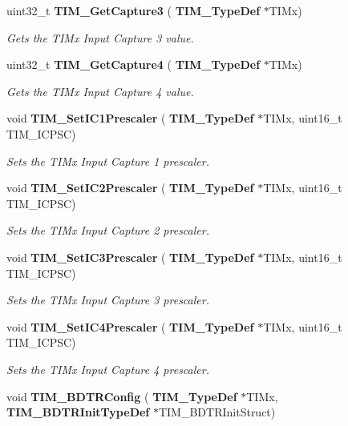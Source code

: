\begin{DoxyCompactItemize}
uint32\+\_\+t \textbf{ T\+I\+M\+\_\+\+Get\+Capture3} (\textbf{ T\+I\+M\+\_\+\+Type\+Def} $\ast$T\+I\+Mx)
\begin{DoxyCompactList}\small\item\em Gets the T\+I\+Mx Input Capture 3 value. \end{DoxyCompactList}\item 
uint32\+\_\+t \textbf{ T\+I\+M\+\_\+\+Get\+Capture4} (\textbf{ T\+I\+M\+\_\+\+Type\+Def} $\ast$T\+I\+Mx)
\begin{DoxyCompactList}\small\item\em Gets the T\+I\+Mx Input Capture 4 value. \end{DoxyCompactList}\item 
void \textbf{ T\+I\+M\+\_\+\+Set\+I\+C1\+Prescaler} (\textbf{ T\+I\+M\+\_\+\+Type\+Def} $\ast$T\+I\+Mx, uint16\+\_\+t T\+I\+M\+\_\+\+I\+C\+P\+SC)
\begin{DoxyCompactList}\small\item\em Sets the T\+I\+Mx Input Capture 1 prescaler. \end{DoxyCompactList}\item 
void \textbf{ T\+I\+M\+\_\+\+Set\+I\+C2\+Prescaler} (\textbf{ T\+I\+M\+\_\+\+Type\+Def} $\ast$T\+I\+Mx, uint16\+\_\+t T\+I\+M\+\_\+\+I\+C\+P\+SC)
\begin{DoxyCompactList}\small\item\em Sets the T\+I\+Mx Input Capture 2 prescaler. \end{DoxyCompactList}\item 
void \textbf{ T\+I\+M\+\_\+\+Set\+I\+C3\+Prescaler} (\textbf{ T\+I\+M\+\_\+\+Type\+Def} $\ast$T\+I\+Mx, uint16\+\_\+t T\+I\+M\+\_\+\+I\+C\+P\+SC)
\begin{DoxyCompactList}\small\item\em Sets the T\+I\+Mx Input Capture 3 prescaler. \end{DoxyCompactList}\item 
void \textbf{ T\+I\+M\+\_\+\+Set\+I\+C4\+Prescaler} (\textbf{ T\+I\+M\+\_\+\+Type\+Def} $\ast$T\+I\+Mx, uint16\+\_\+t T\+I\+M\+\_\+\+I\+C\+P\+SC)
\begin{DoxyCompactList}\small\item\em Sets the T\+I\+Mx Input Capture 4 prescaler. \end{DoxyCompactList}\item 
void \textbf{ T\+I\+M\+\_\+\+B\+D\+T\+R\+Config} (\textbf{ T\+I\+M\+\_\+\+Type\+Def} $\ast$T\+I\+Mx, \textbf{ T\+I\+M\+\_\+\+B\+D\+T\+R\+Init\+Type\+Def} $\ast$T\+I\+M\+\_\+\+B\+D\+T\+R\+Init\+Struct)

\end{DoxyCompactItemize}
